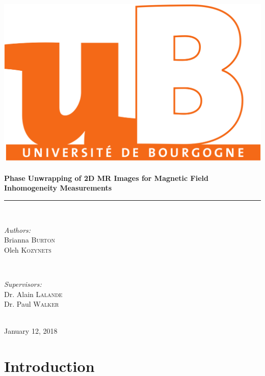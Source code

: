 \documentclass[11pt,a4paper,table]{article}
\begin{document}
\begin{titlepage}
\vspace*{\fill}
\newcommand{\HRule}{\rule{\linewidth}{0.5mm}}

\center

\includegraphics[scale=0.1]{logo.png}\\[1cm]
\\[0.5cm]

{ \Large \bfseries Phase Unwrapping of 2D MR Images for Magnetic Field Inhomogeneity Measurements}\\[0.4cm]
\HRule \\[1.5cm]

\begin{minipage}{0.4\textwidth}
\begin{flushleft} \large
\emph{Authors:}\\
Brianna \textsc{Burton}\\
Oleh \textsc{Kozynets}\\
\end{flushleft}
\end{minipage}
~
\begin{minipage}{0.4\textwidth}
\begin{flushright} \large
\emph{Supervisors:} \\
Dr. Alain \textsc{Lalande}\\
Dr. Paul \textsc{Walker}\\
\end{flushright}
\end{minipage}\\[2cm]

{\large January 12, 2018}\\[1cm]
\vspace*{\fill}

\end{titlepage}

\setcounter{page}{2}

\section{Introduction}


\pagebreak

%
%
\pagebreak
\end{document}
